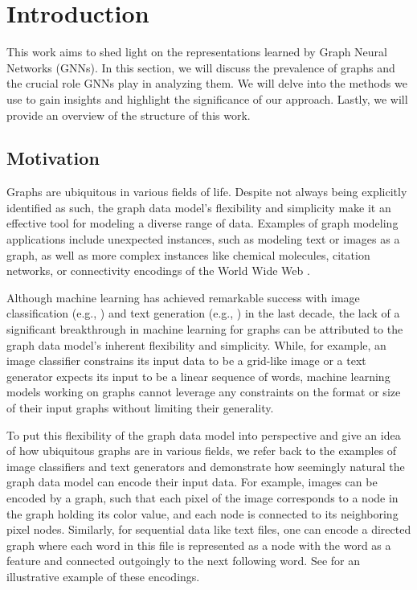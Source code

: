 \section{Introduction}
This work aims to shed light on the representations learned by Graph Neural Networks (GNNs). In this section, we will discuss the prevalence of graphs and the crucial role GNNs play in analyzing them. We will delve into the methods we use to gain insights and highlight the significance of our approach. Lastly, we will provide an overview of the structure of this work.

\subsection{Motivation}
Graphs are ubiquitous in various fields of life. Despite not always being explicitly identified as such, the graph data model's flexibility and simplicity make it an effective tool for modeling a diverse range of data. Examples of graph modeling applications include unexpected instances, such as modeling text or images as a graph, as well as more complex instances like chemical molecules, citation networks, or connectivity encodings of the World Wide Web \cite{Mor+2020, Sca+2009}.

Although machine learning has achieved remarkable success with image classification (e.g., \cite{Zoph2018, He2016}) and text generation (e.g., \cite{Radford2019, Brown2020}) in the last decade, the lack of a significant breakthrough in machine learning for graphs can be attributed to the graph data model's inherent flexibility and simplicity. While, for example, an image classifier constrains its input data to be a grid-like image or a text generator expects its input to be a linear sequence of words, machine learning models working on graphs cannot leverage any constraints on the format or size of their input graphs without limiting their generality. 

To put this flexibility of the graph data model into perspective and give an idea of how ubiquitous graphs are in various fields, we refer back to the examples of image classifiers and text generators and demonstrate how seemingly natural the graph data model can encode their input data. For example, images can be encoded by a graph, such that each pixel of the image corresponds to a node in the graph holding its color value, and each node is connected to its neighboring pixel nodes. Similarly, for sequential data like text files, one can encode a directed graph where each word in this file is represented as a node with the word as a feature and connected outgoingly to the next following word. See  for an illustrative example of these encodings.

